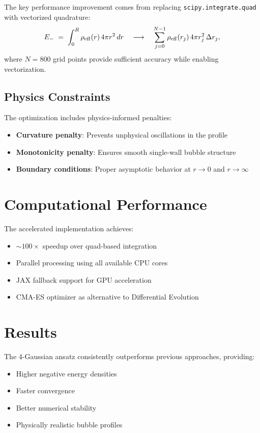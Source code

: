 \documentclass[12pt]{article}
\begin{document}
The key performance improvement comes from replacing \texttt{scipy.integrate.quad} with vectorized quadrature:
\[
  E_{-} \;=\; \int_0^R \rho_{\rm eff}(r)\,4\pi r^2 \,dr 
  \quad\longrightarrow\quad
  \sum_{j=0}^{N-1} \rho_{\rm eff}(r_j)\,4\pi r_j^2\,\Delta r_j,
\]
where \(N=800\) grid points provide sufficient accuracy while enabling vectorization.

\subsection{Physics Constraints}

The optimization includes physics-informed penalties:
\begin{itemize}
\item \textbf{Curvature penalty}: Prevents unphysical oscillations in the profile
\item \textbf{Monotonicity penalty}: Ensures smooth single-wall bubble structure
\item \textbf{Boundary conditions}: Proper asymptotic behavior at \(r \to 0\) and \(r \to \infty\)
\end{itemize}

\section{Computational Performance}

The accelerated implementation achieves:
\begin{itemize}
\item \(\sim100\times\) speedup over quad-based integration
\item Parallel processing using all available CPU cores
\item JAX fallback support for GPU acceleration
\item CMA-ES optimizer as alternative to Differential Evolution
\end{itemize}

\section{Results}

The 4-Gaussian ansatz consistently outperforms previous approaches, providing:
\begin{itemize}
\item Higher negative energy densities
\item Faster convergence
\item Better numerical stability
\item Physically realistic bubble profiles
\end{itemize}
\end{document}
